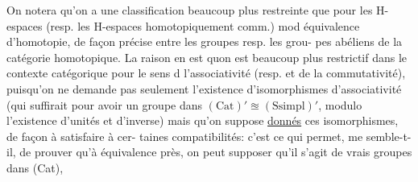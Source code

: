 On notera qu'on a une  classification beaucoup plus restreinte
que pour les H-espaces (resp. les H-espaces homotopiquement comm.) mod
équivalence d'homotopie, de façon précise entre les groupes resp. les grou-
pes abéliens de la catégorie homotopique. La raison en est quon est beaucoup
plus restrictif dans le contexte catégorique pour le sens d l'associativité
(resp. et de la commutativité), puisqu'on ne demande pas seulement
l'existence d'isomorphismes d'associativité\deleted{,} (qui suffirait pour avoir un
groupe dans  $(\mathrm{Cat})' \approxeq (\mathrm{Ssimpl})'$, modulo l'existence d'unités et d'inverse)
mais qu'on suppose \uline{donnés} ces isomorphismes, de façon à satisfaire à cer-
taines compatibilités: c'est ce qui permet, me semble-t-il, de prouver qu'à
 \margin{(} équivalence près, on peut supposer qu'il s'agit de vrais groupes dans
(Cat), 

